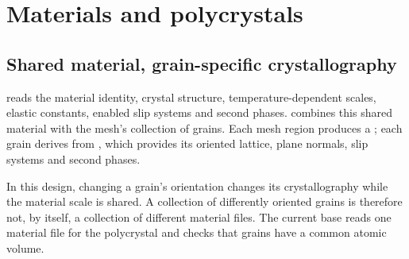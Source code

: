 \chapter{Materials and polycrystals}\label{chap:materials}
\section{Shared material, grain-specific crystallography}
 reads the material identity, crystal structure, temperature-dependent scales, elastic constants, enabled slip systems and second phases.  combines this shared material with the mesh's collection of grains. Each mesh region produces a ; each grain derives from , which provides its oriented lattice, plane normals, slip systems and second phases.

In this design, changing a grain's orientation changes its crystallography while the material scale is shared. A collection of differently oriented grains is therefore not, by itself, a collection of different material files. The current base reads one material file for the polycrystal and checks that grains have a common atomic volume.

